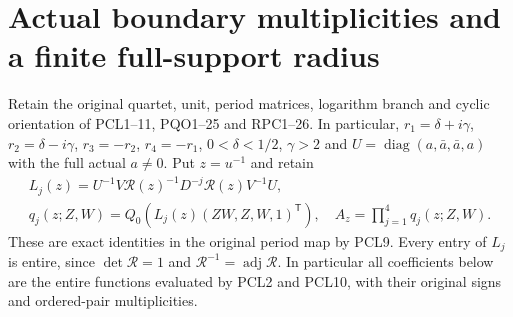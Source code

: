 \documentclass[11pt,a4paper]{article}
\begin{document}

\clearpage
\section{Actual boundary multiplicities and a finite full-support radius}
\label{sec:ASR}

Retain the original quartet, unit, period matrices, logarithm branch and
cyclic orientation of PCL1--11, PQO1--25 and RPC1--26. In particular,
$r_1=\delta+i\gamma$, $r_2=\delta-i\gamma$, $r_3=-r_2$,
$r_4=-r_1$, $0<\delta<1/2$, $\gamma>2$ and
$U=\operatorname{diag}(a,\bar a,\bar a,a)$ with the full actual
$a\ne0$. Put $z=u^{-1}$ and retain
\[
\begin{gathered}
 L_j(z)=U^{-1}V\mathcal R(z)^{-1}D^{-j}\mathcal R(z)V^{-1}U,
 \\
 q_j(z;Z,W)=Q_0(L_j(z)(ZW,Z,W,1)^{\mathsf T}),
 \quad A_z=\prod_{j=1}^4q_j(z;Z,W).
\end{gathered}
 \tag{ASR1}
\]
These are exact identities in the original period map by PCL9.
Every entry of $L_j$ is entire, since $\det\mathcal R=1$ and
$\mathcal R^{-1}=\operatorname{adj}\mathcal R$. In particular all
coefficients below are the entire functions evaluated by PCL2 and
PCL10, with their original signs and ordered-pair multiplicities.
\end{document}
